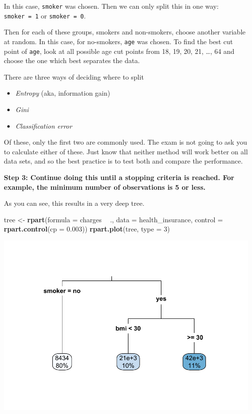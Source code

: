 \documentclass[]{book}
\newenvironment{Shaded}{\begin{snugshade}}{\end{snugshade}}
\newcommand{\DataTypeTok}[1]{\textcolor[rgb]{0.13,0.29,0.53}{#1}}
\newcommand{\DecValTok}[1]{\textcolor[rgb]{0.00,0.00,0.81}{#1}}
\newcommand{\FloatTok}[1]{\textcolor[rgb]{0.00,0.00,0.81}{#1}}
\newcommand{\KeywordTok}[1]{\textcolor[rgb]{0.13,0.29,0.53}{\textbf{#1}}}
\newcommand{\NormalTok}[1]{#1}
\newcommand{\OperatorTok}[1]{\textcolor[rgb]{0.81,0.36,0.00}{\textbf{#1}}}
\newcommand{\StringTok}[1]{\textcolor[rgb]{0.31,0.60,0.02}{#1}}
\providecommand{\tightlist}{%
  \setlength{\itemsep}{0pt}\setlength{\parskip}{0pt}}
\begin{document}
In this case, \texttt{smoker} was chosen. Then we can only split this in one way: \texttt{smoker\ =\ 1} or \texttt{smoker\ =\ 0}.

Then for each of these groups, smokers and non-smokers, choose another variable at random. In this case, for no-smokers, \texttt{age} was chosen. To find the best cut point of \texttt{age}, look at all possible age cut points from 18, 19, 20, 21, \ldots, 64 and choose the one which best separates the data.

There are three ways of deciding where to split

\begin{itemize}
\tightlist
\item
  \emph{Entropy} (aka, information gain)
\item
  \emph{Gini}
\item
  \emph{Classification error}
\end{itemize}

Of these, only the first two are commonly used. The exam is not going to ask you to calculate either of these. Just know that neither method will work better on all data sets, and so the best practice is to test both and compare the performance.

\textbf{Step 3: Continue doing this until a stopping criteria is reached. For example, the minimum number of observations is 5 or less.}

As you can see, this results in a very deep tree.

\begin{Shaded}
\begin{Highlighting}[]
\NormalTok{tree <-}\StringTok{ }\KeywordTok{rpart}\NormalTok{(}\DataTypeTok{formula =}\NormalTok{ charges }\OperatorTok{~}\StringTok{  }\NormalTok{., }\DataTypeTok{data =}\NormalTok{ health_insurance,}
              \DataTypeTok{control =} \KeywordTok{rpart.control}\NormalTok{(}\DataTypeTok{cp =} \FloatTok{0.003}\NormalTok{))}
\KeywordTok{rpart.plot}\NormalTok{(tree, }\DataTypeTok{type =} \DecValTok{3}\NormalTok{)}
\end{Highlighting}
\end{Shaded}

\includegraphics{Exam-PA-Study-Manual_files/figure-latex/unnamed-chunk-118-1.pdf}
\end{document}
